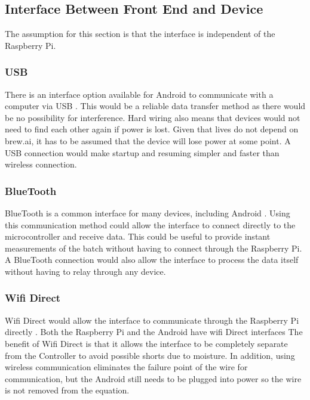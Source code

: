 \documentclass[draftclsnofoot,onecolumn,letterpaper,10pt]{IEEEtran}
\begin{document}
\subsection{Interface Between Front End and Device}
The assumption for this section is that the interface is independent of the Raspberry Pi.

\subsubsection{USB}
There is an interface option available for Android to communicate with a computer via USB \cite{USB}.
This would be a reliable data transfer method as there would be no possibility for interference.
Hard wiring also means that devices would not need to find each other again if power is lost.
Given that lives do not depend on brew.ai, it has to be assumed that the device will lose power at some point.
A USB connection would make startup and resuming simpler and faster than wireless connection.


\subsubsection{BlueTooth}
BlueTooth is a common interface for many devices, including Android \cite{BlueTooth}.
Using this communication method could allow the interface to connect directly to the microcontroller and receive data.
This could be useful to provide instant measurements of the batch without having to connect through the Raspberry Pi.
A BlueTooth connection would also allow the interface to process the data itself without having to relay through any device.


\subsubsection{Wifi Direct}
Wifi Direct would allow the interface to communicate through the Raspberry Pi directly \cite{PiWifiDirect}.
Both the Raspberry Pi and the Android have wifi Direct interfaces \cite{AndroidWifiDirect}
The benefit of Wifi Direct is that it allows the interface to be completely separate from the Controller to avoid possible shorts due to moisture.
In addition, using wireless communication eliminates the failure point of the wire for communication, but the Android still needs to be plugged into power so the wire is not removed from the equation.
\end{document}
